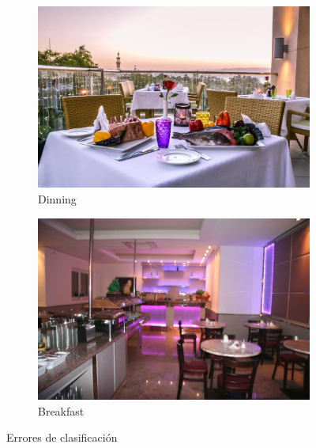 \documentclass{article}[9pt]
\begin{document}
\begin{figure}[H]
  \begin{subfigure}{.5\textwidth}
    \includegraphics[width=\linewidth]{img/dinning.jpg}
    \caption{Dinning}
    \end{subfigure}
     \begin{subfigure}{.5\textwidth}
     \includegraphics[width=\linewidth]{img/breakfast.png}
   \caption{Breakfast}
    \end{subfigure}
\caption{Errores de clasificación}
\label{fig:test}
\end{figure}

\end{document}

